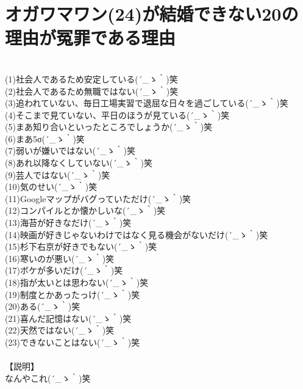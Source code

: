 \newpage
\section{オガワマワン(24)が結婚できない20の理由が冤罪である理由}
　\\
(1)社会人であるため安定している{\sf (´\_ゝ｀)}笑\\
(2)社会人であるため無職ではない{\sf (´\_ゝ｀)}笑\\
(3)追われていない、毎日工場実習で退屈な日々を過ごしている{\sf (´\_ゝ｀)}笑\\
(4)そこまで見ていない、平日のほうが見ている{\sf (´\_ゝ｀)}笑\\
(5)まあ知り合いといったところでしょうか{\sf (´\_ゝ｀)}笑\\
(6)まあ5σ{\sf (´\_ゝ｀)}笑\\
(7)弱いが嫌いではない{\sf (´\_ゝ｀)}笑\\
(8)あれ以降なくしていない{\sf (´\_ゝ｀)}笑\\
(9)芸人ではない{\sf (´\_ゝ｀)}笑\\
(10)気のせい{\sf (´\_ゝ｀)}笑\\
(11)Googleマップがバグっていただけ{\sf (´\_ゝ｀)}笑\\
(12)コンパイルとか懐かしいな{\sf (´\_ゝ｀)}笑\\
(13)海苔が好きなだけ{\sf (´\_ゝ｀)}笑\\
(14)映画が好きじゃないわけではなく見る機会がないだけ{\sf (´\_ゝ｀)}笑\\
(15)杉下右京が好きでもない{\sf (´\_ゝ｀)}笑\\
(16)寒いのが悪い{\sf (´\_ゝ｀)}笑\\
(17)ボケが多いだけ{\sf (´\_ゝ｀)}笑\\
(18)指が太いとは思わない{\sf (´\_ゝ｀)}笑\\
(19)制度とかあったっけ{\sf (´\_ゝ｀)}笑\\
(20)ある{\sf (´\_ゝ｀)}笑\\
(21)喜んだ記憶はない{\sf (´\_ゝ｀)}笑\\
(22)天然ではない{\sf (´\_ゝ｀)}笑\\
(23)できないことはない{\sf (´\_ゝ｀)}笑\\
\\
【説明】\\
なんやこれ{\sf (´\_ゝ｀)}笑\\


\newpage
